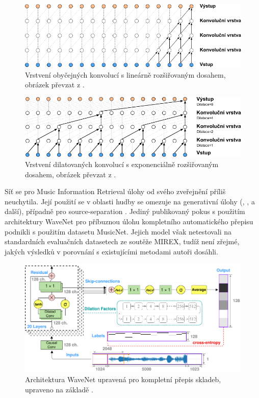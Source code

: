 \begin{figure}[h!]\centering
\includegraphics[scale=0.7]{../img/wavenet_konvoluce}
\caption{Vrstvení obyčejných konvolucí s lineárně rozšiřovaným dosahem, obrázek převzat z \cite{Oord2016}.}
\label{obr:wavenet_conv}
\end{figure}

\begin{figure}[h!]\centering
\includegraphics[scale=0.7]{../img/wavenet_dilatace_konvoluce}
\caption{Vrstvení dilatovaných konvolucí s exponenciálně rozšiřovaným dosahem, obrázek převzat z \cite{Oord2016}.}
\label{obr:wavenet_dilated}
\end{figure}

Síť se pro Music Information Retrieval úlohy od svého zveřejnění příliš neuchytila. Její použití se v oblasti hudby se omezuje na generativní úlohy (\cite{Hawthorne2018a}, \cite{Yang2017}, \cite{Engel2017} a další), případně pro source-separation \citep{Stoller2018}. Jediný publikovaný pokus s použitím architektury WaveNet pro příbuznou úlohu kompletního automatického přepisu podnikli \cite{Martak2018} s použitím datasetu MusicNet. Jejich model však netestovali na standardních evaluačních datasetech ze soutěže MIREX, tudíž není zřejmé, jakých výsledků v porovnání s existujícími metodami autoři dosáhli.



\begin{figure}[h]\centering
\includegraphics[width=\textwidth,height=\textheight,keepaspectratio]{../img/wavenet_arch}
\caption{Architektura WaveNet upravená pro kompletní přepis skladeb, upraveno na základě \cite{Martak2018}.}
\label{obr:wavenet_arch}
\end{figure}

